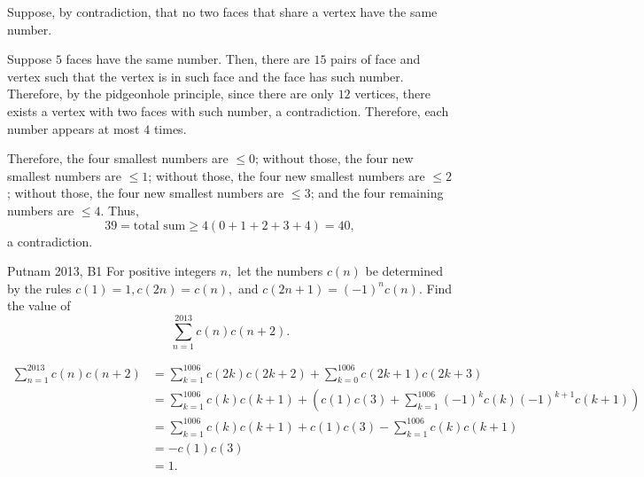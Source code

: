\begin{sol}{}{}
	Suppose, by contradiction, that no two faces that share a vertex have the same number. 

	Suppose \(5\) faces have the same number. Then, there are \(15\) pairs of face and vertex such that the vertex is in such face and the face has such number. Therefore, by the pidgeonhole principle, since there are only \(12\) vertices, there exists a vertex with two faces with such number, a contradiction. Therefore, each number appears at most \(4\) times.

	Therefore, the four smallest numbers are \(\leq 0\);
	without those, the four new smallest numbers are \(\leq 1\);
	without those, the four new smallest numbers are \(\leq 2\);
	without those, the four new smallest numbers are \(\leq 3\);
	and the four remaining numbers are \(\leq 4\). Thus, \[
		39 = \text{total sum} \geq 4(0 + 1 + 2 + 3 + 4) = 40,
	\]
	a contradiction.
\end{sol}

\begin{prob}{Putnam 2013, B1}{}
For positive integers $n,$ let the numbers $c(n)$ be determined by the rules $c(1)=1,c(2n)=c(n),$ and $c(2n+1)=(-1)^nc(n).$ Find the value of \[\sum_{n=1}^{2013}c(n)c(n+2).\]	
\end{prob}

\begin{sol}{}{}
	\begin{align*}
		\sum_{n=1}^{2013} c(n)c(n+2) &= \sum_{k=1}^{1006}c(2k)c(2k+2) + \sum_{k=0}^{1006}c(2k+1)c(2k+3) \\
									 &= \sum_{k=1}^{1006}c(k)c(k+1) + \left( c(1)c(3) + \sum_{k=1}^{1006}(-1)^{k}c(k)(-1)^{k+1}c(k+1)\right) \\ 
									 &= \sum_{k=1}^{1006}c(k)c(k+1) + c(1)c(3) - \sum_{k=1}^{1006}c(k)c(k+1) \\ 
									 &= -c(1)c(3)\\
									 &= 1.
	\end{align*}
\end{sol}
